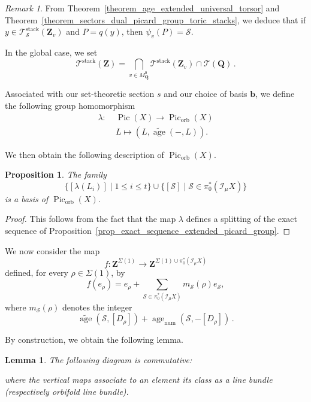 \documentclass{proc-l}
\newcommand{\Z}{\mathbf{Z}}
\newcommand{\Q}{\mathbf{Q}}
\newcommand{\base}{\mathbf{b}}
\DeclareMathOperator{\Pic}{Pic}
\DeclareMathOperator{\stack}{stack}
\DeclareMathOperator{\num}{num}
\DeclareMathOperator{\age}{age}
\DeclareMathOperator{\orb}{orb}
\newcommand{\stackS}{\mathcal{S}}
\newcommand{\stackT}{\mathcal{T}}
\newcommand{\sheafI}{\mathcal{I}}
\newcommand{\twistsector}{\pi_0^*(\sheafI_{\mu} X)}
\newtheorem{lemma}[theorem]{Lemma}
\newtheorem{prop}[theorem]{Proposition}
\theoremstyle{definition}
\theoremstyle{remark}
\newtheorem{remark}[theorem]{Remark}
\numberwithin{equation}{section}
\begin{document}
\begin{remark}
From Theorem~\ref{theorem_age_extended_universal_torsor} and Theorem~\ref{theorem_sectors_dual_picard_group_toric_stacks}, we deduce that if $y \in \stackT^{\stack}_{\stackS}(\Z_v)$ and $P = q(y)$, then $\psi_v(P) = \stackS$.
\end{remark}

In the global case, we set
\begin{equation}\label{equation_global_naive_parametrisation}
\stackT^{\stack}(\Z)
=
\bigcap\limits_{v \in M_{\Q}^0}
\stackT^{\stack}(\Z_v)
\cap
\stackT(\Q) \, .
\end{equation}

Associated with our set-theoretic section $s$ and our choice of basis $\base$, we define the following group homomorphism
\begin{equation}\label{equation_appendix_B_definition_lambda_map}
\begin{aligned}
\lambda :\;& \Pic(X) \longrightarrow \Pic_{\orb}(X) \\
&L \longmapsto (L,\widetilde{\age}(-,L)) .
\end{aligned}
\end{equation}

We then obtain the following description of $\Pic_{\orb}(X)$.

\begin{prop}\label{prop_basis_of_orbifold_picard_group}
The family
$$
\{ [\lambda(L_i)] \mid 1 \leqslant i \leqslant t \}
\cup
\{ [\stackS] \mid \stackS \in \twistsector \}
$$
is a basis of $\Pic_{\orb}(X)$.
\end{prop}

\begin{proof}
This follows from the fact that the map $\lambda$ defines a splitting of the exact sequence of Proposition~\ref{prop_exact_sequence_extended_picard_group}.
\end{proof}

We now consider the map
$$
f : \Z^{\Sigma(1)} \longrightarrow \Z^{\Sigma(1) \cup \twistsector}
$$
defined, for every $\rho \in \Sigma(1)$, by
$$
f(e_{\rho})
=
e_{\rho}
+
\sum\limits_{\stackS \in \twistsector}
m_{\stackS}(\rho) e_{\stackS},
$$
where $m_{\stackS}(\rho)$ denotes the integer
$$
\widetilde{\age}(\stackS,[D_{\rho}])
+
\age_{\num}(\stackS,-[D_{\rho}]) \, .
$$

By construction, we obtain the following lemma.

\begin{lemma}\label{lemma_appendix_B_commutative_diagram}
The following diagram is commutative:
\begin{center}
\end{center}
where the vertical maps associate to an element its class as a line bundle (respectively orbifold line bundle).
\end{lemma}
\end{document}
